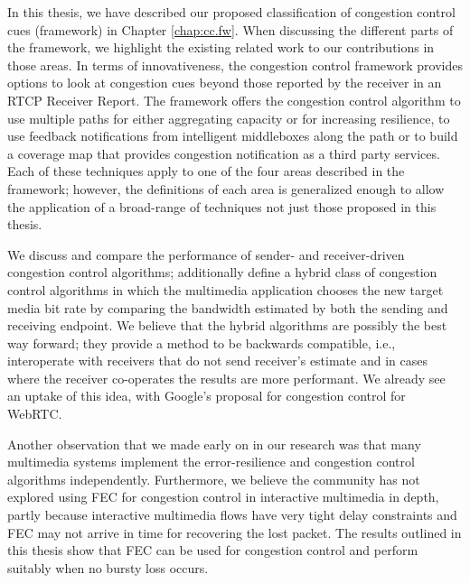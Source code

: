 In this thesis, we have described our proposed classification of congestion
control cues (framework) in Chapter \ref{chap:cc.fw}. When discussing the
different parts of the framework, we highlight the existing related work to
our contributions in those areas. In terms of innovativeness, the congestion
control framework provides options to look at congestion cues beyond those
reported by the receiver in an RTCP Receiver Report. The framework offers the
congestion control algorithm to use multiple paths for either aggregating
capacity or for increasing resilience, to use feedback notifications from
intelligent middleboxes along the path or to build a coverage map that
provides congestion notification as a third party services. Each of these
techniques apply to one of the four areas described in the framework; however,
the definitions of each area is generalized enough to allow the application of
a broad-range of techniques not just those proposed in this thesis.


We discuss and compare the performance of sender- and receiver-driven
congestion control algorithms; additionally define a hybrid class of
congestion control algorithms in which the multimedia application chooses the
new target media bit rate by comparing the bandwidth estimated by both the
sending and receiving endpoint. We believe that the hybrid algorithms are
possibly the best way forward; they provide a method to be backwards
compatible, i.e., interoperate with receivers that do not send receiver’s
estimate and in cases where the receiver co-operates the results are more
performant. We already see an uptake of this idea, with Google’s proposal for
congestion control for WebRTC.

Another observation that we made early on in our research was that many
multimedia systems implement the error-resilience and congestion control
algorithms independently. Furthermore, we believe the community has not
explored using FEC for congestion control in interactive multimedia in depth,
partly because interactive multimedia flows have very tight delay constraints
and FEC may not arrive in time for recovering the lost packet. The results
outlined in this thesis show that FEC can be used for congestion control and
perform suitably when no bursty loss occurs. 

